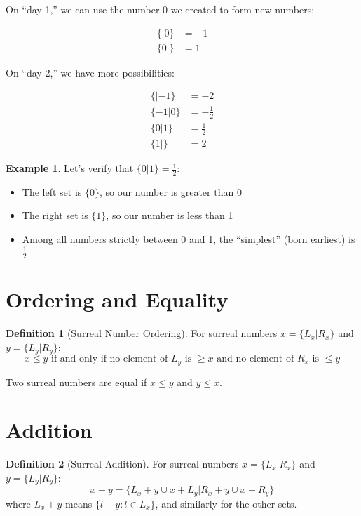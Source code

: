 \documentclass[11pt,a4paper]{article}
\theoremstyle{definition}
\newtheorem{definition}{Definition}[section]
\newtheorem{example}{Example}[section]
\begin{document}
On ``day 1,'' we can use the number 0 we created to form new numbers:

\begin{align}
\{|0\} &= -1 \\
\{0|\} &= 1
\end{align}

On ``day 2,'' we have more possibilities:

\begin{align}
\{|-1\} &= -2 \\
\{-1|0\} &= -\frac{1}{2} \\
\{0|1\} &= \frac{1}{2} \\
\{1|\} &= 2
\end{align}

\begin{example}
Let's verify that $\{0|1\} = \frac{1}{2}$:
\begin{itemize}
    \item The left set is $\{0\}$, so our number is greater than 0
    \item The right set is $\{1\}$, so our number is less than 1
    \item Among all numbers strictly between 0 and 1, the ``simplest'' (born earliest) is $\frac{1}{2}$
\end{itemize}
\end{example}

\section{Ordering and Equality}

\begin{definition}[Surreal Number Ordering]
For surreal numbers $x = \{L_x|R_x\}$ and $y = \{L_y|R_y\}$:
$$x \leq y \text{ if and only if } \text{no element of } L_y \text{ is } \geq x \text{ and no element of } R_x \text{ is } \leq y$$
\end{definition}

Two surreal numbers are equal if $x \leq y$ and $y \leq x$.

\section{Addition}

\begin{definition}[Surreal Addition]
For surreal numbers $x = \{L_x|R_x\}$ and $y = \{L_y|R_y\}$:
$$x + y = \{L_x + y \cup x + L_y | R_x + y \cup x + R_y\}$$
where $L_x + y$ means $\{l + y : l \in L_x\}$, and similarly for the other sets.
\end{definition}
\end{document}
